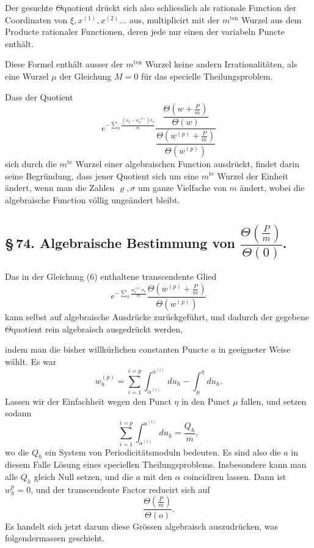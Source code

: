 \documentclass[10pt]{article}
\begin{document}
Der gesuchte \(\Theta\)quotient drückt sich also schliesslich als rationale Function der Coordinaten von \(\xi,x^{(1)},x^{(2)}\ldots\) aus, multiplicirt mit der \(m^{\text{ten}}\) Wurzel aus dem Producte rationaler Functionen, deren jede nur einen der variabeln Puncte enthält.

Diese Formel enthält ausser der \(m^{\text{ten}}\) Wurzel keine andern Irrationalitäten, als eine Wurzel \(\mu\) der Gleichung \(M=0\) für das specielle Theilungsproblem.

Dass der Quotient
\[
e^{-\sum_h\frac{(w_h-w_h^{(p)})\sigma_h}{m}}
\frac{\dfrac{\Theta\left(w+\frac Pm\right)}{\Theta(w)}}
     {\dfrac{\Theta\left(w^{(p)}+\frac Pm\right)}{\Theta(w^{(p)})}}
\]
sich durch die \(m^{\text{te}}\) Wurzel einer algebraischen Function ausdrückt, findet darin seine Begründung, dass jener Quotient sich um eine \(m^{\text{te}}\) Wurzel der Einheit ändert, wenn man die Zahlen \(\varrho,\sigma\) um ganze Vielfache von \(m\) ändert, wobei die algebraische Function völlig ungeändert bleibt.

\subsection*{\S\,74. Algebraische Bestimmung von \(\dfrac{\Theta\left(\frac Pm\right)}{\Theta(0)}\).}

Das in der Gleichung (6) enthaltene transcendente Glied
\[
e^{-\sum_h\frac{w_h^{(p)}\sigma_h}{m}}
\frac{\Theta\left(w^{(p)}+\frac Pm\right)}{\Theta(w^{(p)})}
\]
kann selbst auf algebraische Ausdrücke zurückgeführt, und dadurch der gegebene \(\Theta\)quotient rein algebraisch ausgedrückt werden,



indem man die bisher willkürlichen constanten Puncte \(a\) in geeigneter Weise wählt. Es war
\[
w_h^{(p)}=\sum_{i=1}^{i=p}\int_{\alpha^{(i)}}^{a^{(i)}}du_h-\int_{\mu}^{\eta}du_h.
\]
Lassen wir der Einfachheit wegen den Punct \(\eta\) in den Punct \(\mu\) fallen, und setzen sodann
\[
\sum_{i=1}^{i=p}\int_{\alpha^{(i)}}^{a^{(i)}}du_h=\frac{Q_h}{m},
\]
wo die \(Q_h\) ein System von Periodicitätsmoduln bedeuten. Es sind also die \(a\) in diesem Falle Lösung eines speciellen Theilungsproblems. Insbesondere kann man alle \(Q_h\) gleich Null setzen, und die \(a\) mit den \(\alpha\) coincidiren lassen. Dann ist \(w_h^{p}=0\), und der transcendente Factor reducirt sich auf
\[
\frac{\Theta\left(\frac Pm\right)}{\Theta(o)}.
\]
Es handelt sich jetzt darum diese Grössen algebraisch auszudrücken, was folgendermassen geschieht.
\end{document}
